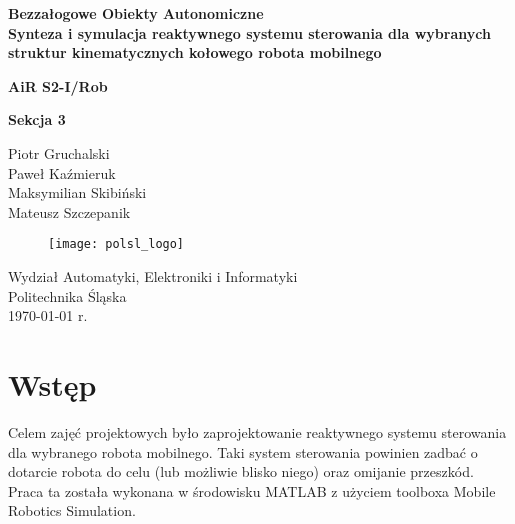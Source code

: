 \documentclass[11pt]{article}
\begin{document}
\begin{titlepage}
	\begin{center}
		\textbf{\LARGE Bezzałogowe Obiekty Autonomiczne\\%
		\vspace{1cm}%
		Synteza i symulacja reaktywnego systemu sterowania dla
		wybranych struktur kinematycznych kołowego robota mobilnego%
		}
		
		\vspace{0.75cm}
		
		\vspace{1.0cm}
		
		{\large \textbf{AiR S2-I/Rob}}
		
		\vspace{0.2cm}
		
		{\large \textbf{Sekcja 3}}
		
		\vspace{0.5cm}
		
		{\large
		Piotr Gruchalski\\
		Paweł Kaźmieruk\\
		Maksymilian Skibiński\\
		Mateusz Szczepanik%
		}
		
		\vspace{0.2cm}

		\vspace{2.0cm}
		
		\vfill
		
		\begin{figure}[h]
			\centering
			\texttt{[image: polsl\_logo]}
		\end{figure}
		
		
		\vspace{0.5cm}
		
		Wydział Automatyki, Elektroniki i Informatyki\\
		Politechnika Śląska\\
		\today{} r.%
	\end{center}
\end{titlepage}

\setcounter{page}{2}
\section{Wstęp}

Celem zajęć projektowych było zaprojektowanie reaktywnego systemu sterowania dla wybranego robota mobilnego. Taki system sterowania powinien zadbać o dotarcie robota do celu (lub możliwie blisko niego) oraz omijanie przeszkód. Praca ta została wykonana w środowisku MATLAB z użyciem toolboxa Mobile Robotics Simulation.
\end{document}
